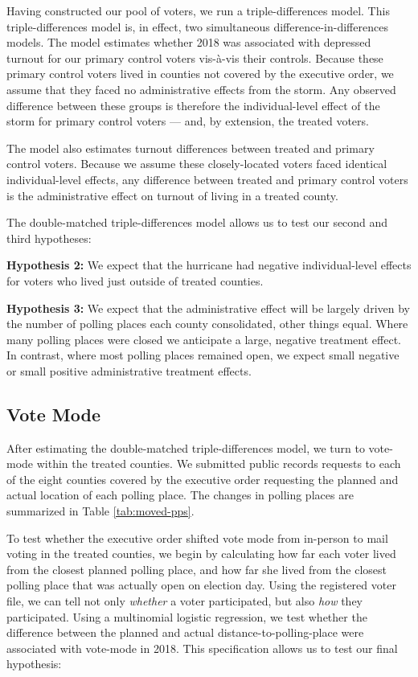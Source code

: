\documentclass[
  12pt,
]{article}
\begin{document}
Having constructed our pool of voters, we run a triple-differences model. This triple-differences model is, in effect, two simultaneous difference-in-differences models. The model estimates whether 2018 was associated with depressed turnout for our primary control voters vis-à-vis their controls. Because these primary control voters lived in counties not covered by the executive order, we assume that they faced no administrative effects from the storm. Any observed difference between these groups is therefore the individual-level effect of the storm for primary control voters --- and, by extension, the treated voters.

The model also estimates turnout differences between treated and primary control voters. Because we assume these closely-located voters faced identical individual-level effects, any difference between treated and primary control voters is the administrative effect on turnout of living in a treated county.

The double-matched triple-differences model allows us to test our second and third hypotheses:

\textbf{Hypothesis 2:} We expect that the hurricane had negative individual-level effects for voters who lived just outside of treated counties.

\textbf{Hypothesis 3:} We expect that the administrative effect will be largely driven by the number of polling places each county consolidated, other things equal. Where many polling places were closed we anticipate a large, negative treatment effect. In contrast, where most polling places remained open, we expect small negative or small positive administrative treatment effects.

\hypertarget{vote-mode}{%
\subsection*{Vote Mode}\label{vote-mode}}

After estimating the double-matched triple-differences model, we turn to vote-mode within the treated counties. We submitted public records requests to each of the eight counties covered by the executive order requesting the planned and actual location of each polling place. The changes in polling places are summarized in Table \ref{tab:moved-pps}.

To test whether the executive order shifted vote mode from in-person to mail voting in the treated counties, we begin by calculating how far each voter lived from the closest planned polling place, and how far she lived from the closest polling place that was actually open on election day. Using the registered voter file, we can tell not only \emph{whether} a voter participated, but also \emph{how} they participated. Using a multinomial logistic regression, we test whether the difference between the planned and actual distance-to-polling-place were associated with vote-mode in 2018. This specification allows us to test our final hypothesis:
\end{document}
